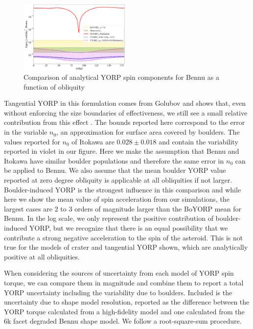 \begin{figure}[H]
    \centering
    \includegraphics[width=0.49\textwidth]{fig/all_yorps.png}
    \caption{Comparison of analytical YORP spin components for Bennu as a function of obliquity}
    \label{fig:all_yorps}
\end{figure}
Tangential YORP in this formulation comes from Golubov and shows that, even without enforcing the size boundaries of effectiveness, we still see a small relative contribution from this effect \cite{Golubov2017}. The bounds reported here correspond to the error in the variable $n_0$, an approximation for surface area covered by boulders. The values reported for $n_0$ of Itokawa are $0.028\pm0.018$ and contain the variability reported in violet in our figure. Here we make the assumption that Bennu and Itokawa have similar boulder populations and therefore the same error in $n_0$ can be applied to Bennu. We also assume that the mean boulder YORP value reported at zero degree obliquity is applicable at all obliquities if not larger. Boulder-induced YORP is the strongest influence in this comparison and while here we show the mean value of spin acceleration from our simulations, the largest cases are 2 to 3 orders of magnitude larger than the BoYORP mean for Bennu. In the log scale, we only represent the positive contribution of boulder-induced YORP, but we recognize that there is an equal possibility that we contribute a strong negative acceleration to the spin of the asteroid. This is not true for the models of crater and tangential YORP shown, which are analytically positive at all obliquities. 


When considering the sources of uncertainty from each model of YORP spin torque, we can compare them in magnitude and combine them to report a total YORP uncertainty including the variability due to boulders. Included is the uncertainty due to shape model resolution, reported as the difference between the YORP torque calculated from a high-fidelity model and one calculated from the $~$6k facet degraded Bennu shape model. We follow a root-square-sum procedure. 

